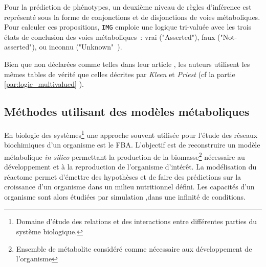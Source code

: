 \begin{refsegment}
    Pour la prédiction de phénotypes, un deuxième niveau de règles d’inférence est représenté sous la forme de conjonctions et de disjonctions de voies métaboliques. Pour calculer ces propositions, \texttt{IMG} emploie une logique tri-valuée avec les trois états de conclusion des voies métaboliques : vrai ("Asserted"), faux ("Not-asserted"), ou inconnu ("Unknown" ).
    
    Bien que non déclarées comme telles dans leur article , les auteurs utilisent les mêmes tables de vérité que celles décrites par \textit{Kleen} et \textit{Priest} (cf la partie \ref{par:logic_multivalued}  ). 
    
    \subsection{Méthodes utilisant des modèles métaboliques}
    
    En biologie des systèmes\footnote{Domaine d'étude des relations et des interactions entre différentes parties du système biologique.} une approche souvent utilisée pour l'étude des réseaux biochimiques d'un organisme est le \gls{FBA}\cite{orth2010flux}. L'objectif est de reconstruire un modèle métabolique \textit{in silico} permettant la production de la biomasse\footnote{Ensemble de métabolite considéré comme nécessaire aux développement de l'organisme} nécessaire au développement et à la reproduction de l'organisme d'intérêt. La modélisation du réactome permet d'émettre des hypothèses et de faire des prédictions sur la croissance d'un organisme dans un milieu nutritionnel défini. Les capacités d'un organisme sont alors étudiées par simulation ,dans une infinité de conditions.
    

\end{refsegment}
